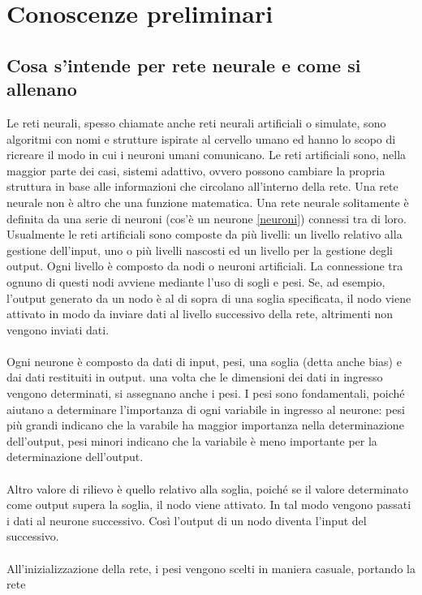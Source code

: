 \chapter{Conoscenze preliminari}
\label{ch:Conoscenze Preliminari}
\section{Cosa s'intende per rete neurale e come si allenano}
Le reti neurali, spesso chiamate anche reti neurali artificiali o simulate, sono algoritmi con nomi e strutture 
ispirate al cervello umano ed hanno lo scopo di ricreare il modo in cui i neuroni umani comunicano.
Le reti artificiali sono, nella maggior parte dei casi, sistemi adattivo, ovvero possono cambiare
la propria struttura in base alle informazioni che circolano all'interno della rete.
Una rete neurale non è altro che una funzione matematica. Una rete neurale solitamente è definita 
da una serie di neuroni (cos'è un neurone \ref{neuroni}) connessi tra di loro.
Usualmente le reti artificiali sono composte da più livelli: un livello relativo alla gestione dell'input,
uno o più livelli nascosti ed un livello per la gestione degli output.
Ogni livello è composto da nodi o neuroni artificiali.
La connessione tra ognuno di questi nodi avviene mediante l'uso di sogli e pesi. Se, ad esempio, 
l'output generato da un nodo è al di sopra di una soglia specificata, il nodo viene attivato in modo 
da inviare dati al livello successivo della rete, altrimenti non vengono inviati dati.
\\\\
Ogni neurone è composto da dati di input, pesi, una soglia (detta anche bias) e dai dati restituiti in output.
una volta che le dimensioni dei dati in ingresso vengono determinati, si assegnano anche i pesi.
I pesi sono fondamentali, poiché aiutano a determinare l'importanza di ogni variabile in ingresso 
al neurone: pesi più grandi indicano che la varabile ha maggior importanza nella determinazione dell'output,
pesi minori indicano che la variabile è meno importante per la determinazione dell'output.
\\\\
Altro valore di rilievo è quello relativo alla soglia, poiché se il valore determinato come output supera la soglia, 
il nodo viene attivato. In tal modo vengono passati i dati al neurone successivo.
Così l'output di un nodo diventa l'input del successivo.
\\\\
All'inizializzazione della rete, i pesi vengono scelti in maniera casuale, portando la rete 
